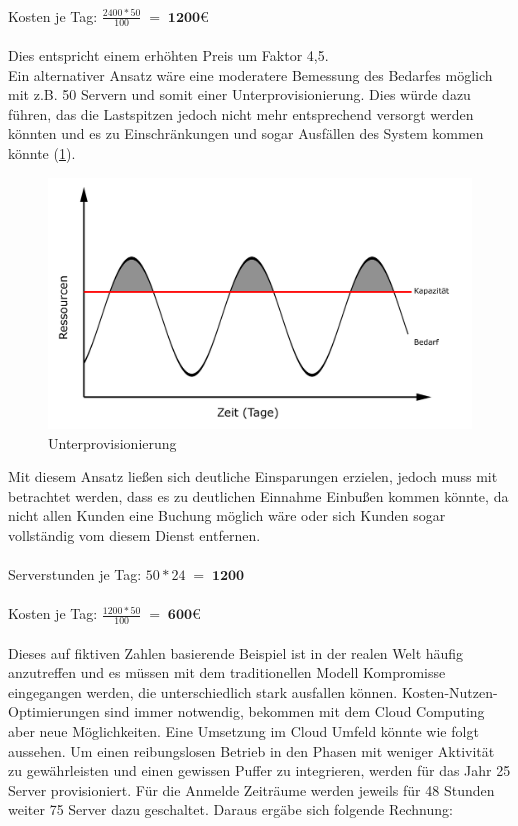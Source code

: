 \\
Kosten je Tag:           $\displaystyle \frac{2400 * 50}{100}\; =\; \textbf{1200€} $\\
\\
Dies entspricht einem erhöhten Preis um Faktor 4,5.
\\
Ein alternativer Ansatz wäre eine moderatere Bemessung des Bedarfes möglich mit z.B. 50 Servern und somit einer Unterprovisionierung. Dies würde dazu führen, das die Lastspitzen jedoch nicht mehr entsprechend versorgt werden könnten und es zu Einschränkungen und sogar Ausfällen des System kommen könnte (\ref{fig:underprovisioning}). 
	\begin{figure}[h]
		\centering
		\includegraphics[width=0.7\linewidth]{images/underprovisioning}
		\caption{Unterprovisionierung}
		\label{fig:underprovisioning}
	\end{figure}
Mit diesem Ansatz ließen sich deutliche Einsparungen erzielen, jedoch muss mit betrachtet werden, dass es zu deutlichen Einnahme Einbußen kommen könnte, da nicht allen Kunden eine Buchung möglich wäre oder sich Kunden sogar vollständig vom diesem Dienst entfernen.
\\
\\
Serverstunden je Tag:    $\displaystyle 50 * 24 \; =\; \textbf{1200}	 $\\
\\
Kosten je Tag:           $\displaystyle \frac{1200 * 50}{100}\; =\; \textbf{600€} $\\
\\
Dieses auf fiktiven Zahlen basierende Beispiel ist in der realen Welt häufig anzutreffen und es müssen mit dem traditionellen Modell Kompromisse eingegangen werden, die unterschiedlich stark ausfallen können. Kosten-Nutzen-Optimierungen sind immer notwendig, bekommen mit dem Cloud Computing aber neue Möglichkeiten. Eine Umsetzung im Cloud Umfeld könnte wie folgt aussehen. Um einen reibungslosen Betrieb in den Phasen mit weniger Aktivität zu gewährleisten und einen gewissen Puffer zu integrieren, werden für das Jahr 25 Server provisioniert. Für die Anmelde Zeiträume werden jeweils für 48 Stunden weiter 75 Server dazu geschaltet. Daraus ergäbe sich folgende Rechnung:
